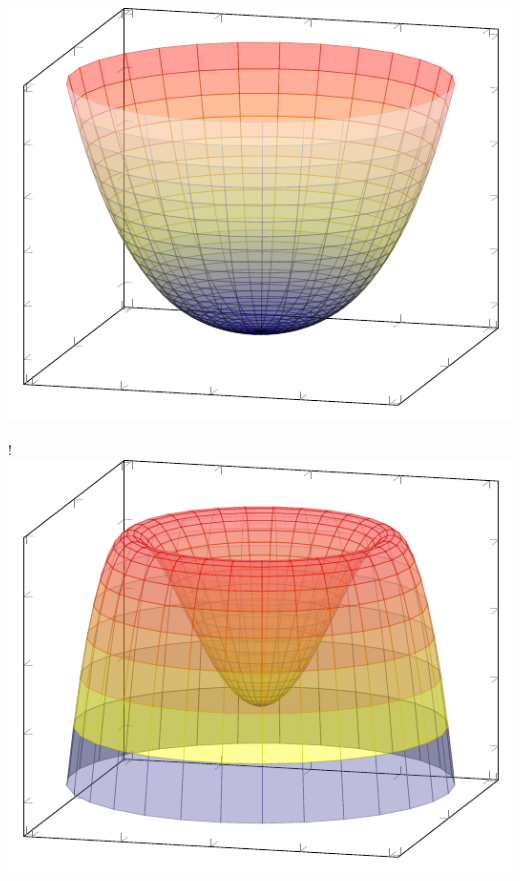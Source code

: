 {{\includegraphics[scale=1]{SM/pp.pdf}
}
\captionsetup{type=subfigure}\caption{$\mu^{2}>0$, $\lambda>0$.}
\resizebox {\marginparwidth} {!} 
{
\includegraphics[scale=1]{SM/pm.pdf}
}}
